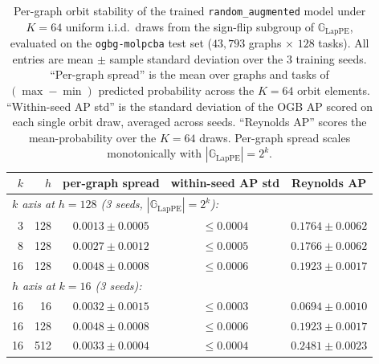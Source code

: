 \documentclass{article}
\theoremstyle{definition}
\theoremstyle{plain}
\newcommand{\G}{\mathbb{G}}
\begin{document}
\begin{table}[h]
\centering
\caption{Per-graph orbit stability of the trained
\texttt{random\_augmented} model under $K\!=\!64$ uniform i.i.d.\
draws from the sign-flip subgroup of $\G_{\mathrm{LapPE}}$, evaluated
on the \texttt{ogbg-molpcba} test set ($43{,}793$ graphs $\times$
$128$ tasks). All entries are mean $\pm$ sample standard deviation
over the $3$ training seeds. ``Per-graph spread'' is the mean over
graphs and tasks of $(\max\!-\!\min)$ predicted probability across
the $K\!=\!64$ orbit elements. ``Within-seed AP std'' is the standard
deviation of the OGB AP scored on each single orbit draw, averaged
across seeds. ``Reynolds AP'' scores the mean-probability over the
$K\!=\!64$ draws. Per-graph spread scales monotonically with
$|\G_{\mathrm{LapPE}}|\!=\!2^{k}$.}
\label{tab:lpe_molpcba_orbit}
\begin{tabular}{rrccc}
\toprule
$k$ & $h$ & per-graph spread & within-seed AP std & Reynolds AP \\
\midrule
\multicolumn{5}{l}{\emph{$k$ axis at $h\!=\!128$ (3 seeds, $|\G_{\mathrm{LapPE}}|\!=\!2^{k}$):}} \\
 3  & 128 & $0.0013 \pm 0.0005$ & $\le 0.0004$ & $0.1764 \pm 0.0062$ \\
 8  & 128 & $0.0027 \pm 0.0012$ & $\le 0.0005$ & $0.1766 \pm 0.0062$ \\
16  & 128 & $0.0048 \pm 0.0008$ & $\le 0.0006$ & $0.1923 \pm 0.0017$ \\
\midrule
\multicolumn{5}{l}{\emph{$h$ axis at $k\!=\!16$ (3 seeds):}} \\
16  &  16 & $0.0032 \pm 0.0015$ & $\le 0.0003$ & $0.0694 \pm 0.0010$ \\
16  & 128 & $0.0048 \pm 0.0008$ & $\le 0.0006$ & $0.1923 \pm 0.0017$ \\
16  & 512 & $0.0033 \pm 0.0004$ & $\le 0.0004$ & $0.2481 \pm 0.0023$ \\
\bottomrule
\end{tabular}
\end{table}
\end{document}
